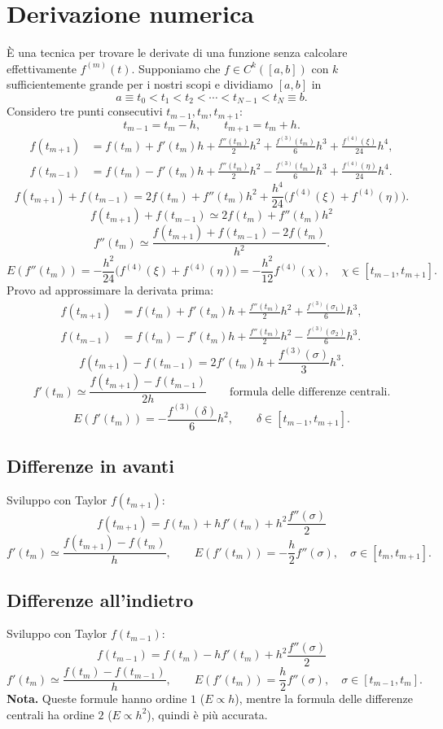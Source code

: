 \section*{Derivazione numerica}
È una tecnica per trovare le derivate di una funzione senza calcolare effettivamente $f^{(m)}(t)$.
Supponiamo che $f\in C^k([a,b])$ con $k$ sufficientemente grande per i nostri scopi e dividiamo $[a,b]$ in
\[a\equiv t_0<t_1<t_2<\cdots<t_{N-1}<t_N\equiv b.\]
Considero tre punti consecutivi $t_{m-1},t_m,t_{m+1}$:
\[t_{m-1}=t_m-h,\qquad t_{m+1}=t_m+h.\]
\begin{align*}
f(t_{m+1})&=f(t_m)+f'(t_m)h+\frac{f''(t_m)}2h^2+\frac{f^{(3)}(t_m)}6h^3+\frac{f^{(4)}(\xi)}{24}h^4,\\
f(t_{m-1})&=f(t_m)-f'(t_m)h+\frac{f''(t_m)}2h^2-\frac{f^{(3)}(t_m)}6h^3+\frac{f^{(4)}(\eta)}{24}h^4.
\end{align*}
\[f(t_{m+1})+f(t_{m-1})=2f(t_m)+f''(t_m)h^2+\frac{h^4}{24}\bigl(f^{(4)}(\xi)+f^{(4)}(\eta)\bigr).\]
\[f(t_{m+1})+f(t_{m-1})\simeq2f(t_m)+f''(t_m)h^2\]
\[\boxed{f''(t_m)\simeq\frac{f(t_{m+1})+f(t_{m-1})-2f(t_m)}{h^2}}.\]
\[\boxed{E(f''(t_m))=-\frac{h^2}{24}\bigl(f^{(4)}(\xi)+f^{(4)}(\eta)\bigr)=-\frac{h^2}{12}f^{(4)}(\chi)},\quad\chi\in[t_{m-1},t_{m+1}].\]
Provo ad approssimare la derivata prima:
\begin{align*}
f(t_{m+1})&=f(t_m)+f'(t_m)h+\frac{f''(t_m)}2h^2+\frac{f^{(3)}(\sigma_1)}6h^3,\\
f(t_{m-1})&=f(t_m)-f'(t_m)h+\frac{f''(t_m)}2h^2-\frac{f^{(3)}(\sigma_2)}6h^3.
\end{align*}
\[f(t_{m+1})-f(t_{m-1})=2f'(t_m)h+\frac{f^{(3)}(\sigma)}3h^3.\]
\[\boxed{f'(t_m)\simeq\frac{f(t_{m+1})-f(t_{m-1})}{2h}}\qquad\text{formula delle differenze centrali}.\]
\[\boxed{E(f'(t_m))=-\frac{f^{(3)}(\delta)}6h^2},\qquad\delta\in[t_{m-1},t_{m+1}].\]
\subsection*{Differenze in avanti}
Sviluppo con Taylor $f(t_{m+1})$:
\[f(t_{m+1})=f(t_m)+hf'(t_m)+h^2\frac{f''(\sigma)}2\]
\[\boxed{f'(t_m)\simeq\frac{f(t_{m+1})-f(t_m)}h},\qquad
\boxed{E(f'(t_m))=-\frac h2 f''(\sigma)},\quad\sigma\in[t_m,t_{m+1}].\]
\subsection*{Differenze all'indietro}
Sviluppo con Taylor $f(t_{m-1})$:
\[f(t_{m-1})=f(t_m)-hf'(t_m)+h^2\frac{f''(\sigma)}2\]
\[\boxed{f'(t_m)\simeq\frac{f(t_m)-f(t_{m-1})}h},\qquad
\boxed{E(f'(t_m))=\frac h2 f''(\sigma)},\quad\sigma\in[t_{m-1},t_m].\]
\textbf{Nota.} Queste formule hanno ordine $1$ ($E\propto h$), mentre la formula delle differenze centrali ha ordine $2$ ($E\propto h^2$), quindi è più accurata.
